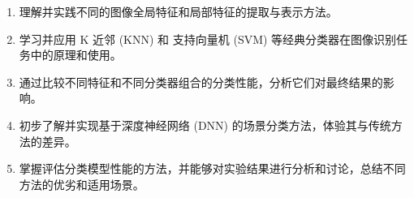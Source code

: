 \begin{enumerate}
    \item 理解并实践不同的图像全局特征和局部特征的提取与表示方法。
    \item 学习并应用 K 近邻 (KNN) 和 支持向量机 (SVM) 等经典分类器在图像识别任务中的原理和使用。
    \item 通过比较不同特征和不同分类器组合的分类性能，分析它们对最终结果的影响。
    \item 初步了解并实现基于深度神经网络 (DNN) 的场景分类方法，体验其与传统方法的差异。
    \item 掌握评估分类模型性能的方法，并能够对实验结果进行分析和讨论，总结不同方法的优劣和适用场景。
\end{enumerate}
